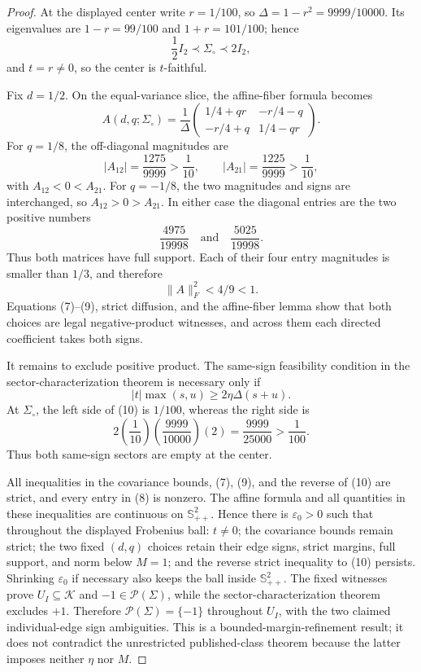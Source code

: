 \documentclass{article}
\begin{document}
\begin{proof}
At the displayed center write \(r=1/100\), so \(\Delta=1-r^2=9999/10000\). Its eigenvalues are \(1-r=99/100\) and \(1+r=101/100\); hence
\[
\frac12 I_2\prec\Sigma_{\circ}\prec2I_2,
\]
and \(t=r\ne0\), so the center is \(t\)-faithful.

Fix \(d=1/2\). On the equal-variance slice, the affine-fiber formula becomes
\[
A(d,q;\Sigma_{\circ})
=\frac1\Delta
\begin{pmatrix}
1/4+qr&-r/4-q\\
-r/4+q&1/4-qr
\end{pmatrix}. \tag{6}
\]
For \(q=1/8\), the off-diagonal magnitudes are
\[
|A_{12}|=\frac{1275}{9999}>\frac1{10},
\qquad
|A_{21}|=\frac{1225}{9999}>\frac1{10}, \tag{7}
\]
with \(A_{12}<0<A_{21}\). For \(q=-1/8\), the two magnitudes and signs are interchanged, so \(A_{12}>0>A_{21}\). In either case the diagonal entries are the two positive numbers
\[
\frac{4975}{19998}
\quad\text{and}\quad
\frac{5025}{19998}. \tag{8}
\]
Thus both matrices have full support. Each of their four entry magnitudes is smaller than \(1/3\), and therefore
\[
\lVert A\rVert_F^2<4/9<1. \tag{9}
\]
Equations (7)--(9), strict diffusion, and the affine-fiber lemma show that both choices are legal negative-product witnesses, and across them each directed coefficient takes both signs.

It remains to exclude positive product. The same-sign feasibility condition in the sector-characterization theorem is necessary only if
\[
|t|\max(s,u)\ge2\eta\Delta(s+u). \tag{10}
\]
At \(\Sigma_{\circ}\), the left side of (10) is \(1/100\), whereas the right side is
\[
2\left(\frac1{10}\right)\left(\frac{9999}{10000}\right)(2)
=\frac{9999}{25000}>\frac1{100}. \tag{11}
\]
Thus both same-sign sectors are empty at the center.

All inequalities in the covariance bounds, (7), (9), and the reverse of (10) are strict, and every entry in (8) is nonzero. The affine formula and all quantities in these inequalities are continuous on \(\mathbb S_{++}^{2}\). Hence there is \(\varepsilon_0>0\) such that throughout the displayed Frobenius ball: \(t\ne0\); the covariance bounds remain strict; the two fixed \((d,q)\) choices retain their edge signs, strict margins, full support, and norm below \(M=1\); and the reverse strict inequality to (10) persists. Shrinking \(\varepsilon_0\) if necessary also keeps the ball inside \(\mathbb S_{++}^{2}\). The fixed witnesses prove \(U_I\subseteq\mathcal K\) and \(-1\in\mathcal P(\Sigma)\), while the sector-characterization theorem excludes \(+1\). Therefore \(\mathcal P(\Sigma)=\{-1\}\) throughout \(U_I\), with the two claimed individual-edge sign ambiguities. This is a bounded-margin-refinement result; it does not contradict the unrestricted published-class theorem because the latter imposes neither \(\eta\) nor \(M\).
\end{proof}
\end{document}

